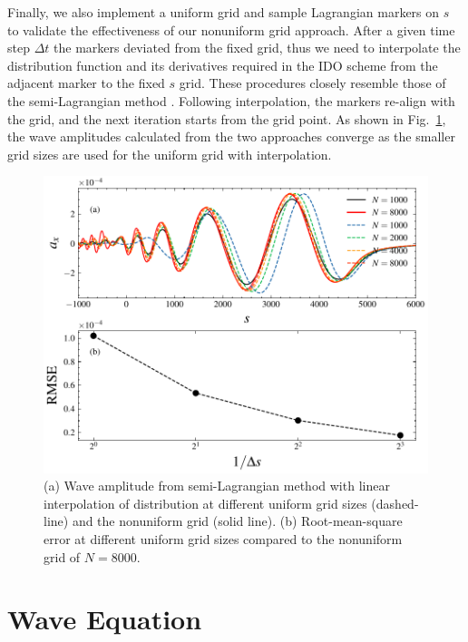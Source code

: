 \documentclass[times,12pt,3p,longtitle]{elsarticle}
\begin{document}
Finally, we also implement a uniform grid and sample Lagrangian markers on $s$ to validate the effectiveness of our nonuniform grid approach.
After a given time step $\Delta t$ the markers deviated from the fixed grid, thus  we need to interpolate the distribution function and its derivatives required in the IDO scheme from the adjacent marker to the fixed $s$ grid.
These procedures closely resemble those of the semi-Lagrangian method \cite{sonnendrucker1999,cottet2018}. Following interpolation, the markers re-align with the grid, and the next iteration starts from the grid point.
As shown in Fig.~\ref{fig.cmp1}, the wave amplitudes calculated from  the two approaches converge  as the smaller grid sizes are used for the uniform grid with interpolation.  
\begin{figure}[htbp]
    \centering
    \includegraphics[scale=0.5]{fig_semiL.pdf}
    \caption{ (a) Wave amplitude from semi-Lagrangian method with linear interpolation of distribution at different uniform grid sizes (dashed-line) and the nonuniform grid (solid line).
    (b) Root-mean-square error at different uniform grid sizes compared to the 
    nonuniform grid of $N=8000$.
    }
    \label{fig.cmp1}
\end{figure}


%
\section{Wave Equation}
\label{sec:wave}
\end{document}
